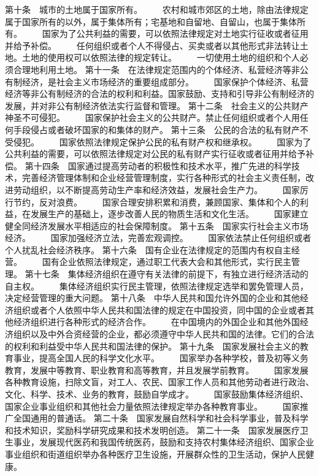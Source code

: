      第十条　城市的土地属于国家所有。
 　　农村和城市郊区的土地，除由法律规定属于国家所有的以外，属于集体所有；宅基地和自留地、自留山，也属于集体所有。
　　国家为了公共利益的需要，可以依照法律规定对土地实行征收或者征用并给予补偿。
　　任何组织或者个人不得侵占、买卖或者以其他形式非法转让土地。土地的使用权可以依照法律的规定转让。
　　一切使用土地的组织和个人必须合理地利用土地。
     第十一条　在法律规定范围内的个体经济、私营经济等非公有制经济，是社会主义市场经济的重要组成部分。
 　　国家保护个体经济、私营经济等非公有制经济的合法的权利和利益。国家鼓励、支持和引导非公有制经济的发展，并对非公有制经济依法实行监督和管理。
     第十二条　社会主义的公共财产神圣不可侵犯。
　　国家保护社会主义的公共财产。禁止任何组织或者个人用任何手段侵占或者破坏国家的和集体的财产。
     第十三条　公民的合法的私有财产不受侵犯。
　　国家依照法律规定保护公民的私有财产权和继承权。
　　国家为了公共利益的需要，可以依照法律规定对公民的私有财产实行征收或者征用并给予补偿。
     第十四条　国家通过提高劳动者的积极性和技术水平，推广先进的科学技术，完善经济管理体制和企业经营管理制度，实行各种形式的社会主义责任制，改进劳动组织，以不断提高劳动生产率和经济效益，发展社会生产力。
　　国家厉行节约，反对浪费。
 　　国家合理安排积累和消费，兼顾国家、集体和个人的利益，在发展生产的基础上，逐步改善人民的物质生活和文化生活。
　　国家建立健全同经济发展水平相适应的社会保障制度。
     第十五条　国家实行社会主义市场经济。
　　国家加强经济立法，完善宏观调控。
　　国家依法禁止任何组织或者个人扰乱社会经济秩序。
     第十六条　国有企业在法律规定的范围内有权自主经营。
　　国有企业依照法律规定，通过职工代表大会和其他形式，实行民主管理。
     第十七条　集体经济组织在遵守有关法律的前提下，有独立进行经济活动的自主权。
　　集体经济组织实行民主管理，依照法律规定选举和罢免管理人员，决定经营管理的重大问题。
     第十八条　中华人民共和国允许外国的企业和其他经济组织或者个人依照中华人民共和国法律的规定在中国投资，同中国的企业或者其他经济组织进行各种形式的经济合作。
 　　在中国境内的外国企业和其他外国经济组织以及中外合资经营的企业，都必须遵守中华人民共和国的法律。它们的合法的权利和利益受中华人民共和国法律的保护。
     第十九条　国家发展社会主义的教育事业，提高全国人民的科学文化水平。
　　国家举办各种学校，普及初等义务教育，发展中等教育、职业教育和高等教育，并且发展学前教育。
 　　国家发展各种教育设施，扫除文盲，对工人、农民、国家工作人员和其他劳动者进行政治、文化、科学、技术、业务的教育，鼓励自学成才。
　　国家鼓励集体经济组织、国家企业事业组织和其他社会力量依照法律规定举办各种教育事业。
　　国家推广全国通用的普通话。
     第二十条　国家发展自然科学和社会科学事业，普及科学和技术知识，奖励科学研究成果和技术发明创造。
     第二十一条　国家发展医疗卫生事业，发展现代医药和我国传统医药，鼓励和支持农村集体经济组织、国家企业事业组织和街道组织举办各种医疗卫生设施，开展群众性的卫生活动，保护人民健康。
